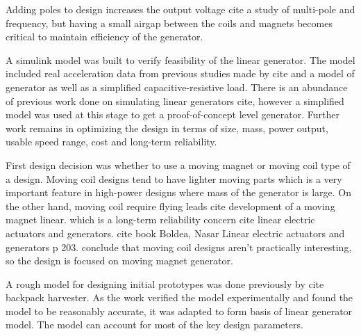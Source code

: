 Adding poles to design increases the output voltage {\color{red} cite a study of multi-pole} and frequency, but having a small airgap between the coils and magnets becomes critical to maintain efficiency of the generator. 

A simulink model was built to verify feasibility of the linear generator. The model included real acceleration data from previous studies made by {\color{red} cite} and a model of generator as well as a simplified capacitive-resistive load. There is an abundance of previous work done on simulating linear generators  {\color{red} cite}, however a simplified model was used at this stage to get a proof-of-concept level generator. Further work remains in optimizing the design in terms of size, mass, power output, usable speed range, cost and long-term reliability.

First design decision was whether to use a moving magnet or moving coil type of a design. Moving coil designs tend to have lighter moving parts which is a very important feature in high-power designs where mass of the generator is large. On the other hand, moving coil require flying leads  {\color{red} cite development of a moving magnet linear}.  which is a long-term reliability concern  {\color{red} cite linear electric actuators and generators}.  {\color{red} cite book Boldea, Nasar Linear electric actuators and generators p 203}. conclude that moving coil designs aren't practically interesting, so the design is focused on moving magnet generator. 

A rough model for designing initial prototypes was done previously by  {\color{red} cite backpack harvester}. As the work verified the model experimentally and found the model to be reasonably accurate, it was adapted to form basis of linear generator model. The model can account for most of the key design parameters. 

\begin{table}[htb]
\caption{\label{parameters_of_lg} Effect of parameters of generator}
\begin{center}
\end{center}
\end{table}

